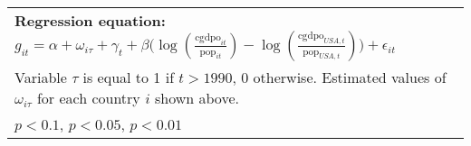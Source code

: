 \begin{table}[htbp]
\begin{tabular}{l*{3}{c}}
\multicolumn{4}{l}{\scriptsize \textbf{Regression equation:} \(g_{it} = \alpha + \omega_{i\tau} + \gamma_t + \beta \big(\log (\frac{\textrm{cgdpo}_{it}}{\textrm{pop}_{it}} ) - \log (\frac{\textrm{cgdpo}_{USA,t}}{\textrm{pop}_{USA,t}}  ) \big) + \epsilon_{it}\)}\\
\multicolumn{4}{l}{\scriptsize Variable \(\tau\) is equal to 1 if \(t > 1990\), 0 otherwise. Estimated values of \(\omega_{i\tau}\) for each country \(i\) shown above.}\\
\multicolumn{4}{l}{\scriptsize \sym{*} \(p<0.1\), \sym{**} \(p<0.05\), \sym{***} \(p<0.01\)}\\
\end{tabular}
\end{table}
